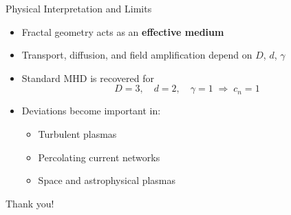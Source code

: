 \documentclass[11pt]{beamer}
\begin{document}
\begin{frame}{Physical Interpretation and Limits}
\begin{itemize}
  \item Fractal geometry acts as an \textbf{effective medium}
  \item Transport, diffusion, and field amplification depend on $D$, $d$, $\gamma$
  \item Standard MHD is recovered for
  \[
    D = 3, \quad d = 2, \quad \gamma = 1
    \;\Rightarrow\;
    c_n = 1
  \]
  \item Deviations become important in:
  \begin{itemize}
    \item Turbulent plasmas
    \item Percolating current networks
    \item Space and astrophysical plasmas
  \end{itemize}
\end{itemize}
\end{frame}


\begin{frame}
  \centering
  {\Huge Thank you!}
\end{frame}
\end{document}
